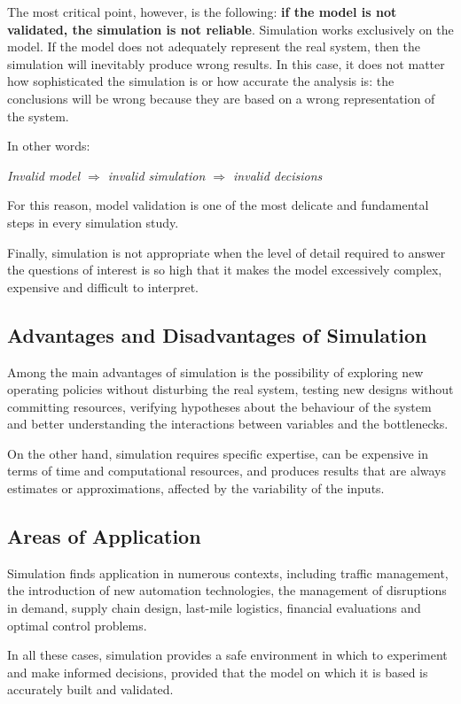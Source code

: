 The most critical point, however, is the following: \textbf{if the model is not validated, the simulation is not reliable}.
Simulation works exclusively on the model. If the model does not adequately represent the real system, then the simulation will inevitably produce wrong results. In this case, it does not matter how sophisticated the simulation is or how accurate the analysis is: the conclusions will be wrong because they are based on a wrong representation of the system.

In other words:
\begin{center}
\emph{Invalid model $\Rightarrow$ invalid simulation $\Rightarrow$ invalid decisions}
\end{center}

For this reason, model validation is one of the most delicate and fundamental steps in every simulation study.

Finally, simulation is not appropriate when the level of detail required to answer the questions of interest is so high that it makes the model excessively complex, expensive and difficult to interpret.

\subsection{Advantages and Disadvantages of Simulation}

Among the main advantages of simulation is the possibility of exploring new operating policies without disturbing the real system, testing new designs without committing resources, verifying hypotheses about the behaviour of the system and better understanding the interactions between variables and the bottlenecks.

On the other hand, simulation requires specific expertise, can be expensive in terms of time and computational resources, and produces results that are always estimates or approximations, affected by the variability of the inputs.

\subsection{Areas of Application}

Simulation finds application in numerous contexts, including traffic management, the introduction of new automation technologies, the management of disruptions in demand, supply chain design, last-mile logistics, financial evaluations and optimal control problems.

In all these cases, simulation provides a safe environment in which to experiment and make informed decisions, provided that the model on which it is based is accurately built and validated.

